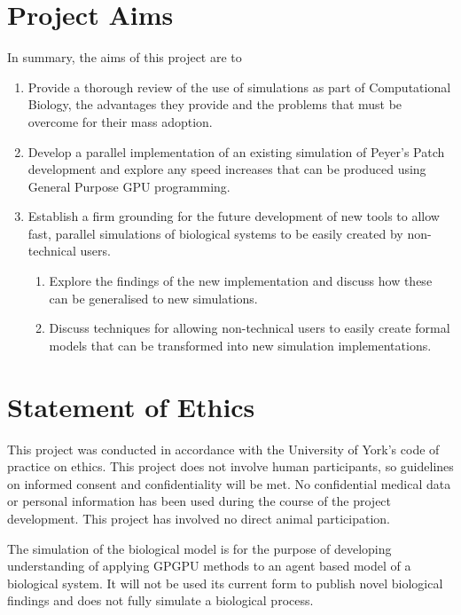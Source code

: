 \documentclass{UoYCSproject}
\begin{document}
\section{Project Aims}
In summary, the aims of this project are to
\begin{enumerate}
	\item Provide a thorough review of the use of simulations as part of Computational Biology, the advantages they provide and the problems that must be overcome for their mass adoption.
	\item Develop a parallel implementation of an existing simulation of Peyer's Patch development and explore any speed increases that can be produced using General Purpose GPU programming.
	\item Establish a firm grounding for the future development of new tools to allow fast, parallel simulations of biological systems to be easily created by non-technical users.
	\begin{enumerate}
		\item Explore the findings of the new implementation and discuss how these can be generalised to new simulations.
		\item Discuss techniques for allowing non-technical users to easily create formal models that can be transformed into new simulation implementations.
	\end{enumerate}
\end{enumerate}

\section{Statement of Ethics}
This project was conducted in accordance with the University of York's code of practice on ethics.
This project does not involve human participants, so guidelines on informed consent and confidentiality will be met. No confidential medical data or personal information has been used during the course of the project development. This project has involved no direct animal participation.

The simulation of the biological model is for the purpose of developing understanding of applying GPGPU methods to an agent based model of a biological system. It will not be used its current form to publish novel biological findings and does not fully simulate a biological process.%
\end{document}
